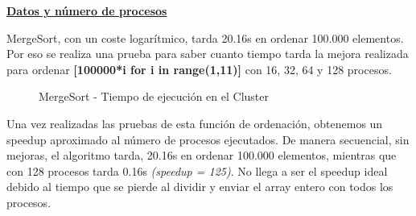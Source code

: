 		\begin{flushleft}
		\begin{mdframed}[roundcorner=5pt]			
			\textbf{\underline{Datos y número de procesos}}
			\vspace{0.1cm}
			
			\scriptsize	
			MergeSort, con un coste logarítmico, tarda 20.16s en ordenar 100.000 elementos. Por eso se realiza una prueba para saber cuanto tiempo tarda la mejora realizada para ordenar \textbf{[100000*i for i in range(1,11)]} con 16, 32, 64 y 128 procesos.
			
		\end{mdframed}
		\end{flushleft}	
		
		\begin{figure}[!h]
			\centering
			\caption{MergeSort - Tiempo de ejecución en el Cluster}
		\end{figure}
		
		Una vez realizadas las pruebas de esta función de ordenación, obtenemos un speedup aproximado al número de procesos ejecutados. De manera secuencial, sin mejoras, el algoritmo tarda, 20.16s en ordenar 100.000 elementos, mientras que con 128 procesos tarda 0.16s \textit{(speedup = 125)}. No llega a ser el speedup ideal debido al tiempo que se pierde al dividir y enviar el array entero con todos los procesos.
		


